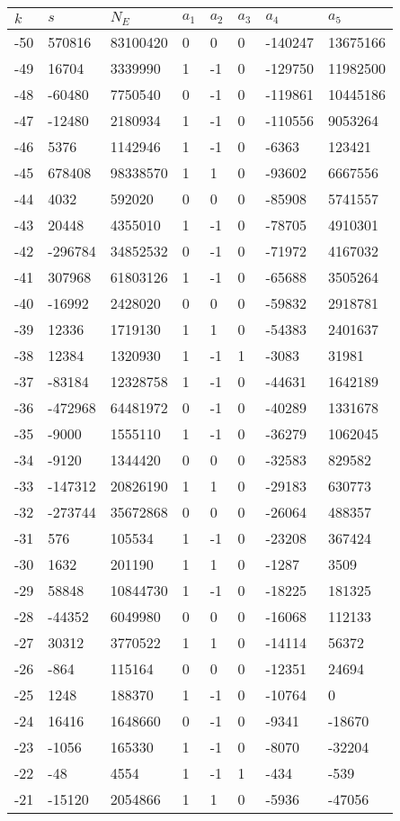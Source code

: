 \documentclass{amsart}
\begin{document}
\begin{longtable}{|l|l|l|lllll|}
\hline
$k$ & $s$ & $N_E$ & $a_1$ & $a_2$ & $a_3$ & $a_4$ & $a_5$\\
\hline
-50&570816&83100420&0&0&0&-140247&13675166\\
-49&16704&3339990&1&-1&0&-129750&11982500\\
-48&-60480&7750540&0&-1&0&-119861&10445186\\
-47&-12480&2180934&1&-1&0&-110556&9053264\\
-46&5376&1142946&1&-1&0&-6363&123421\\
-45&678408&98338570&1&1&0&-93602&6667556\\
-44&4032&592020&0&0&0&-85908&5741557\\
-43&20448&4355010&1&-1&0&-78705&4910301\\
-42&-296784&34852532&0&-1&0&-71972&4167032\\
-41&307968&61803126&1&-1&0&-65688&3505264\\
-40&-16992&2428020&0&0&0&-59832&2918781\\
-39&12336&1719130&1&1&0&-54383&2401637\\
-38&12384&1320930&1&-1&1&-3083&31981\\
-37&-83184&12328758&1&-1&0&-44631&1642189\\
-36&-472968&64481972&0&-1&0&-40289&1331678\\
-35&-9000&1555110&1&-1&0&-36279&1062045\\
-34&-9120&1344420&0&0&0&-32583&829582\\
-33&-147312&20826190&1&1&0&-29183&630773\\
-32&-273744&35672868&0&0&0&-26064&488357\\
-31&576&105534&1&-1&0&-23208&367424\\
-30&1632&201190&1&1&0&-1287&3509\\
-29&58848&10844730&1&-1&0&-18225&181325\\
-28&-44352&6049980&0&0&0&-16068&112133\\
-27&30312&3770522&1&1&0&-14114&56372\\
-26&-864&115164&0&0&0&-12351&24694\\
-25&1248&188370&1&-1&0&-10764&0\\
-24&16416&1648660&0&-1&0&-9341&-18670\\
-23&-1056&165330&1&-1&0&-8070&-32204\\
-22&-48&4554&1&-1&1&-434&-539\\
-21&-15120&2054866&1&1&0&-5936&-47056\\

\end{longtable}
\end{document}
